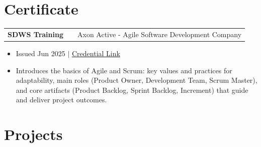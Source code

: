 \documentclass[a4paper,12pt]{article}
\makeatletter
\newenvironment{joblong}[2]
    {
    \begin{tabularx}{\linewidth}{@{}l X r@{}}
    \textbf{#1} & \hfill &  #2 \\[3.75pt]
    \end{tabularx}
    \begin{minipage}[t]{\linewidth}
    \begin{itemize}[nosep,after=\strut, leftmargin=1em, itemsep=3pt,label=--]
    }
    {
    \end{itemize}
    \end{minipage}    
    }
\makeatother
\begin{document}
\section{Certificate}
\begin{joblong}{SDWS Training}{Axon Active - Agile Software Development Company}
\item Issued Jun 2025 $|$ \href{https://verified.sertifier.com/en/verify/35754468941115/}{Credential Link}
\item Introduces the basics of Agile and Scrum: key values and practices for adaptability, main roles (Product Owner, Development Team, Scrum Master), and core artifacts (Product Backlog, Sprint Backlog, Increment) that guide and deliver project outcomes.
\end{joblong}

\section{Projects}

\end{document}
